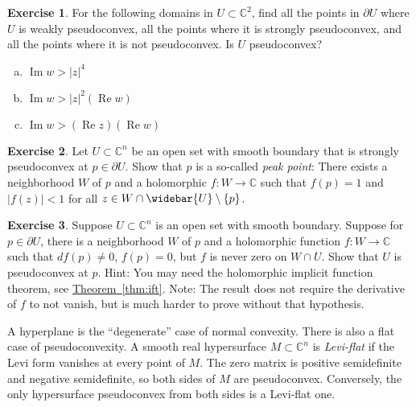 \documentclass[12pt,openany]{book}
\renewcommand{\Re}{\operatorname{Re}}
\renewcommand{\Im}{\operatorname{Im}}
\newcommand{\sabs}[1]{\lvert {#1} \rvert}
\newcommand{\C}{{\mathbb{C}}}
\newcommand{\myindex}[1]{#1\index{#1}}
\theoremstyle{plain}
\theoremstyle{remark}
\theoremstyle{definition}
\newenvironment{exbox}{%
    \def\FrameCommand{\vrule width 1pt \relax\hspace{10pt}}%
    \MakeFramed{\advance\hsize-\width\FrameRestore}%
}{%
    \endMakeFramed
}
\newenvironment{exparts}{%
    \leavevmode\begin{enumerate}[a),noitemsep,topsep=0pt,parsep=0pt,partopsep=0pt]
}{%
    \end{enumerate}
}
\theoremstyle{exercise}
\newtheorem{exercise}{Exercise}[section]
\theoremstyle{example}
\newcommand{\thmref}[1]{\hyperref[#1]{Theorem~\ref*{#1}}}
\begin{document}
\begin{exbox}
\begin{exercise}
\pagebreak[2]
For the following domains in $U \subset \C^2$,
find all the
points in $\partial U$ where $U$ is weakly pseudoconvex, all the points
where it is strongly pseudoconvex, and all the points where it is
not pseudoconvex.  Is $U$ pseudoconvex?
\begin{exparts}
\item
$\Im w > \sabs{z}^4$
\item
$\Im w > \sabs{z}^2(\Re w)$
\item
$\Im w > (\Re z)(\Re w)$
\end{exparts}
\end{exercise}

\begin{exercise}
\pagebreak[2]
Let $U \subset \C^n$ be an open set with smooth boundary that is
strongly pseudoconvex at $p \in \partial U$.  Show that
$p$ is a so-called \emph{\myindex{peak point}}: There
exists a neighborhood $W$ of $p$ and a holomorphic $f \colon
W \to \C$ 
such that $f(p)=1$ and $\sabs{f(z)} < 1$ for all
$z \in W \cap \widebar{U} \setminus \{ p \}$.
\end{exercise}

\begin{exercise}
Suppose $U \subset \C^n$ is an open set with smooth boundary.  Suppose
for $p \in \partial U$, there is a neighborhood $W$ of $p$
and a holomorphic function $f \colon W \to
\C$ such that $df(p) \not= 0$, $f(p) = 0$, but
$f$ is never zero on $W \cap U$.  Show that $U$ is pseudoconvex
at $p$.  Hint: You may need the holomorphic implicit function theorem, see
\thmref{thm:ift}.
Note: The result does not require the derivative of $f$ to not vanish, but is
much harder to prove without that hypothesis.
\end{exercise}
\end{exbox}

A hyperplane is the ``degenerate'' case of normal convexity.
There is also a flat case of pseudoconvexity.  A smooth real hypersurface
$M \subset \C^n$ is \emph{\myindex{Levi-flat}} if the Levi form
vanishes at every point of $M$.  The zero matrix is positive semidefinite
and negative semidefinite, so both sides of $M$ are pseudoconvex.
Conversely, the only hypersurface pseudoconvex from both sides is a
Levi-flat one.
\end{document}

